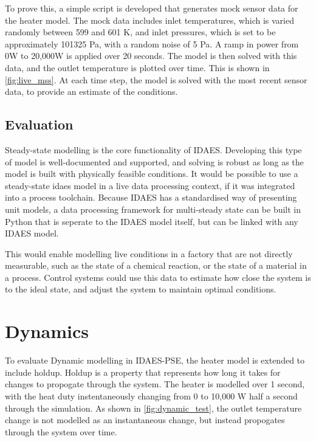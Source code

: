 \documentclass[12pt]{article}
\begin{document}
To prove this, a simple script is developed that generates mock sensor data for the heater model. The mock data includes inlet temperatures, which is varied randomly between 599 and 601 K, and inlet pressures, which is set to be approximately 101325 Pa, with a random noise of 5 Pa. A ramp in power from 0W to 20,000W is applied over 20 seconds. The model is then solved with this data, and the outlet temperature is plotted over time. This is shown in \cref{fig:live_mss}. At each time step, the model is solved with the most recent sensor data, to provide an estimate of the conditions.


\subsection{Evaluation}


Steady-state modelling is the core functionality of IDAES. Developing this type of model is well-documented and supported, and solving is robust as long as the model is built with physically feasible conditions.
It would be possible to use a steady-state idaes model in a live data processing context, if it was integrated into a process toolchain. Because IDAES has a standardised way of presenting unit models, a data processing framework for multi-steady state can be built in Python that is seperate to the IDAES model itself, but can be linked with any IDAES model.

This would enable modelling live conditions in a factory that are not directly measurable, such as the state of a chemical reaction, or the state of a material in a process. Control systems could use this data to estimate how close the system is to the ideal state, and adjust the system to maintain optimal conditions.



\section{Dynamics}

To evaluate Dynamic modelling in IDAES-PSE, the heater model is extended to include holdup. Holdup is a property that represents how long it takes for changes to propogate through the system. The heater is modelled over 1 second, with the heat duty instentaneously changing from 0 to 10,000 W half a second through the simulation. As shown in \cref{fig:dynamic_test}, the outlet temperature change is not modelled as an instantaneous change, but instead propogates through the system over time.
\end{document}
